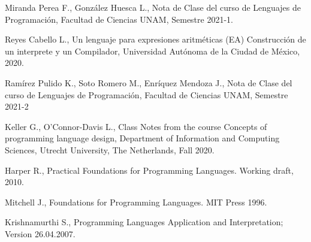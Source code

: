 \documentclass[12pt]{extarticle}
\begin{document}
\begin{thebibliography}{9}

Miranda Perea F., González Huesca L., Nota de Clase del curso de Lenguajes de Programación, Facultad de Ciencias UNAM, Semestre 2021-1.

Reyes Cabello L., Un lenguaje para expresiones aritméticas (EA) Construcción de un interprete y un Compilador, Universidad Autónoma de la Ciudad de México, 2020.

Ramírez Pulido K., Soto Romero M., Enríquez Mendoza J., Nota de Clase del curso de Lenguajes de Programación, Facultad de Ciencias UNAM, Semestre 2021-2

Keller G., O'Connor-Davis L., Class Notes from the course Concepts of programming language design, Department of Information and Computing Sciences, Utrecht University, The Netherlands, Fall 2020.

Harper R., Practical Foundations for Programming Languages. Working draft, 2010.

Mitchell J., Foundations for Programming Languages. MIT Press 1996.

Krishnamurthi S., Programming Languages Application and Interpretation; Version 26.04.2007.


\end{thebibliography}
\end{document}
